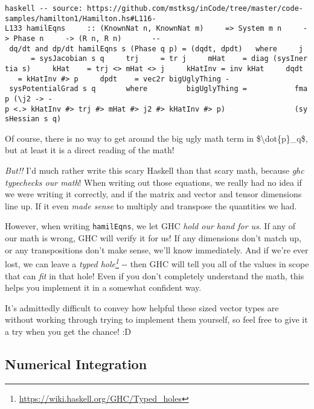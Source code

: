 \documentclass[]{article}
\renewcommand{\href}[2]{#2\footnote{\url{#1}}}
\begin{document}
\texttt{haskell\ -\/-\ source:\ https://github.com/mstksg/inCode/tree/master/code-samples/hamilton1/Hamilton.hs\#L116-L133\ hamilEqns\ \ \ \ \ ::\ (KnownNat\ n,\ KnownNat\ m)\ \ \ \ \ =\textgreater{}\ System\ m\ n\ \ \ \ \ -\textgreater{}\ Phase\ n\ \ \ \ \ -\textgreater{}\ (R\ n,\ R\ n)\ \ \ \ \ \ \ -\/-\ dq/dt\ and\ dp/dt\ hamilEqns\ s\ (Phase\ q\ p)\ =\ (dqdt,\ dpdt)\ \ \ where\ \ \ \ \ j\ \ \ \ \ \ \ =\ sysJacobian\ s\ q\ \ \ \ \ trj\ \ \ \ \ =\ tr\ j\ \ \ \ \ mHat\ \ \ \ =\ diag\ (sysInertia\ s)\ \ \ \ \ kHat\ \ \ \ =\ trj\ \textless{}\textgreater{}\ mHat\ \textless{}\textgreater{}\ j\ \ \ \ \ kHatInv\ =\ inv\ kHat\ \ \ \ \ dqdt\ \ \ \ =\ kHatInv\ \#\textgreater{}\ p\ \ \ \ \ dpdt\ \ \ \ =\ vec2r\ bigUglyThing\ -\ sysPotentialGrad\ s\ q\ \ \ \ \ \ \ where\ \ \ \ \ \ \ \ \ bigUglyThing\ =\ \ \ \ \ \ \ \ \ \ \ fmap\ (\textbackslash{}j2\ -\textgreater{}\ -p\ \textless{}.\textgreater{}\ kHatInv\ \#\textgreater{}\ trj\ \#\textgreater{}\ mHat\ \#\textgreater{}\ j2\ \#\textgreater{}\ kHatInv\ \#\textgreater{}\ p)\ \ \ \ \ \ \ \ \ \ \ \ \ \ \ \ (sysHessian\ s\ q)}

Of course, there is no way to get around the big ugly math term in
\$\textbackslash{}dot\{p\}\_q\$, but at least it is a direct reading of the
math!

\emph{But!!} I'd much rather write this scary Haskell than that scary math,
because \emph{ghc typechecks our math}! When writing out those equations, we
really had no idea if we were writing it correctly, and if the matrix and vector
and tensor dimensions line up. If it even \emph{made sense} to multiply and
transpose the quantities we had.

However, when writing \texttt{hamilEqns}, we let GHC \emph{hold our hand for
us}. If any of our math is wrong, GHC will verify it for us! If any dimensions
don't match up, or any transpositions don't make sense, we'll know immediately.
And if we're ever lost, we can leave a
\emph{\href{https://wiki.haskell.org/GHC/Typed_holes}{typed hole}} -\/- then GHC
will tell you all of the values in scope that can \emph{fit} in that hole! Even
if you don't completely understand the math, this helps you implement it in a
somewhat confident way.

It's admittedly difficult to convey how helpful these sized vector types are
without working through trying to implement them yourself, so feel free to give
it a try when you get the chance! :D

\subsection{Numerical Integration}
\end{document}
